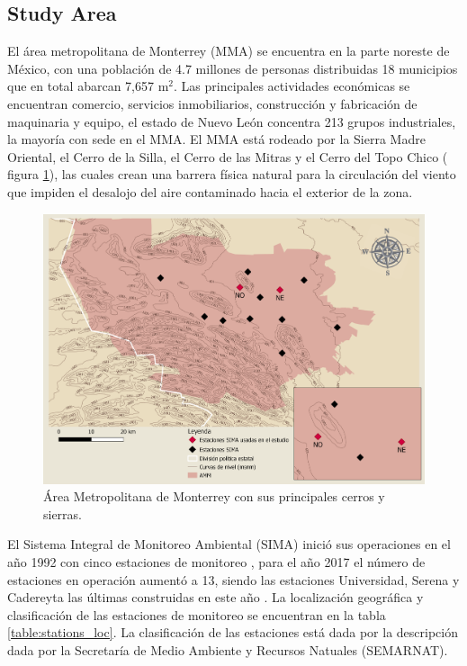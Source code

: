\subsection{Study Area}
El área metropolitana de Monterrey (MMA) se encuentra en la parte noreste de México, con una población de 4.7 millones de personas distribuidas 18 municipios que en total abarcan 7,657 m$^2$\cite{inegi2015}. Las principales actividades económicas se encuentran comercio, servicios inmobiliarios, construcción y fabricación de maquinaria y equipo, el estado de Nuevo León concentra 213 grupos industriales, la mayoría con sede en el MMA. El MMA está rodeado por la Sierra Madre Oriental, el Cerro de la Silla, el Cerro de las Mitras y el Cerro del Topo Chico ( figura \ref{fig:map}), las cuales crean una barrera física natural para la circulación del viento que impiden el desalojo del aire contaminado hacia el exterior de la zona.\cite{proaire2008}
\begin{figure}[H]
  \centering
  \includegraphics[scale=0.2]{images/map.png}
  \caption{Área Metropolitana de Monterrey con sus principales cerros y sierras.}
  \label{fig:map}
\end{figure}
El Sistema Integral de Monitoreo Ambiental (SIMA) inició sus operaciones en el año 1992 con cinco estaciones de monitoreo , para el año 2017 el número de estaciones en operación aumentó a 13, siendo las estaciones Universidad, Serena y Cadereyta las últimas construidas en este año \cite{simapage}. La localización geográfica y clasificación de las estaciones de monitoreo se encuentran en la tabla \ref{table:stations_loc}. La clasificación de las estaciones está dada por la descripción dada por la Secretaría de Medio Ambiente y Recursos Natuales (SEMARNAT). \cite{proaire2016}

